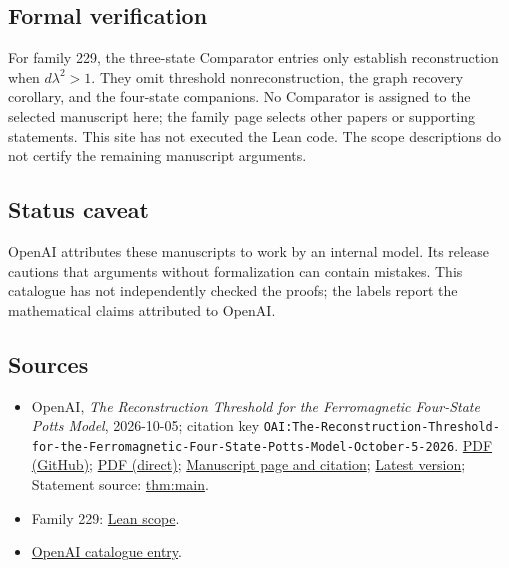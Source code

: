 \documentclass[11pt]{article}
\begin{document}
\subsection{Formal verification}
For family 229, the three-state Comparator entries only establish reconstruction when $d\lambda^2>1$. They omit threshold nonreconstruction, the graph recovery corollary, and the four-state companions. No Comparator is assigned to the selected manuscript here; the family page selects other papers or supporting statements. This site has not executed the Lean code. The scope descriptions do not certify the remaining manuscript arguments.

\subsection{Status caveat}
OpenAI attributes these manuscripts to work by an internal model. Its release cautions that arguments without formalization can contain mistakes. This catalogue has not independently checked the proofs; the labels report the mathematical claims attributed to OpenAI.

\subsection{Sources}
\begin{itemize}
\item OpenAI, \emph{The Reconstruction Threshold for the Ferromagnetic Four-State Potts Model}, 2026-10-05; citation key \texttt{OAI:The-Reconstruction-Threshold-for-the-Ferromagnetic-Four-State-Potts-Model-October-5-2026}. \href{https://github.com/openai/math/blob/adc7f1241b42e322a6451854ab7e4b4c146bf78a/preprints/The-Reconstruction-Threshold-for-the-Ferromagnetic-Four-State-Potts-Model-October-5-2026/four-state-potts.pdf}{PDF (GitHub)}; \href{https://github.com/openai/math/raw/adc7f1241b42e322a6451854ab7e4b4c146bf78a/preprints/The-Reconstruction-Threshold-for-the-Ferromagnetic-Four-State-Potts-Model-October-5-2026/four-state-potts.pdf}{PDF (direct)}; \href{https://github.com/openai/math/blob/adc7f1241b42e322a6451854ab7e4b4c146bf78a/preprints/The-Reconstruction-Threshold-for-the-Ferromagnetic-Four-State-Potts-Model-October-5-2026/README.md}{Manuscript page and citation}; \href{https://github.com/openai/math/blob/main/preprints/The-Reconstruction-Threshold-for-the-Ferromagnetic-Four-State-Potts-Model-October-5-2026/four-state-potts.pdf}{Latest version}; Statement source: \href{https://github.com/openai/math/blob/adc7f1241b42e322a6451854ab7e4b4c146bf78a/preprints/The-Reconstruction-Threshold-for-the-Ferromagnetic-Four-State-Potts-Model-October-5-2026/build/sections/01-introduction.tex\#L40}{thm:main}.
\item Family 229: \href{https://github.com/openai/math/blob/adc7f1241b42e322a6451854ab7e4b4c146bf78a/lean/docs/229.md}{Lean scope}.
\item \href{https://github.com/openai/math/blob/adc7f1241b42e322a6451854ab7e4b4c146bf78a/CONTENTS.md}{OpenAI catalogue entry}.
\end{itemize}
\end{document}
